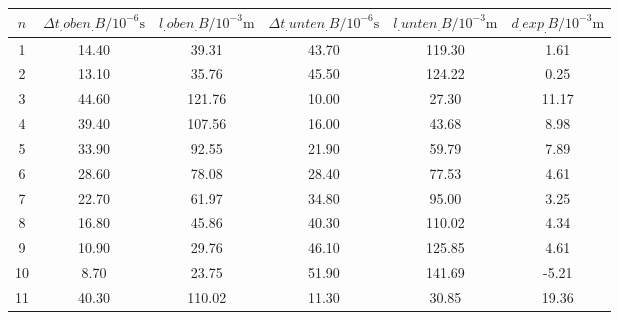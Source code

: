 \label{tab:tabBScan}
	\begin{tabular}{S[table-format=1.0]S[table-format=2.2]S[table-format=2.2]S[table-format=2.2]S[table-format=2.2]S[table-format=2.2]}
		\toprule
		{$n$} & {$\Delta t_.{oben_.{B} }/10^{-6}\si{\second}$} & {$l_.{oben_.{B}}/10^{-3}\si{\metre}$} & {$\Delta t_.{unten_.{B}}/10^{-6}\si{\second}$} & {$l_.{unten_.{B}}/10^{-3}\si{\metre}$} & {$d_.{exp_.{B}}/10^{-3}\si{\metre}$} \\
		 & 14.40 & 39.31 & 43.70 & 119.30 & 1.61 \\
		2 & 13.10 & 35.76 & 45.50 & 124.22 & 0.25 \\
		3 & 44.60 & 121.76 & 10.00 & 27.30 & 11.17 \\
		4 & 39.40 & 107.56 & 16.00 & 43.68 & 8.98 \\
		5 & 33.90 & 92.55 & 21.90 & 59.79 & 7.89 \\
		6 & 28.60 & 78.08 & 28.40 & 77.53 & 4.61 \\
		7 & 22.70 & 61.97 & 34.80 & 95.00 & 3.25 \\
		8 & 16.80 & 45.86 & 40.30 & 110.02 & 4.34 \\
		9 & 10.90 & 29.76 & 46.10 & 125.85 & 4.61 \\
		10 & 8.70 & 23.75 & 51.90 & 141.69 & -5.21 \\
		11 & 40.30 & 110.02 & 11.30 & 30.85 & 19.36 \\
		\bottomrule
	\end{tabular}
